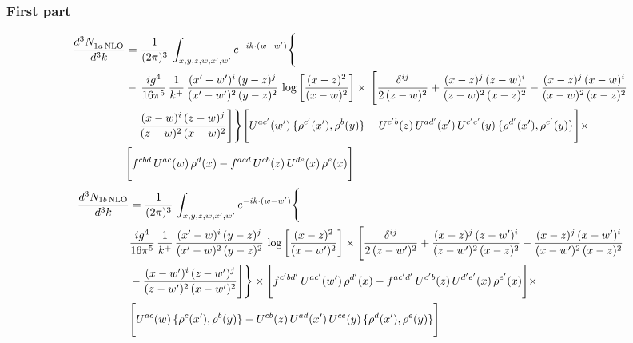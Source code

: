 \documentclass[9pt]{article}
\numberwithin{equation}{section}
\begin{document}
\subsubsection{First part}
\begin{align}
 \frac{d^{3}N_{1a\,\rm NLO}^{\rm}}{d^{3}k}  & =     \frac{1}{(2\pi)^{3}}\,\int_{x,y,z,w,x',w^{\prime}} e^{-ik\cdot (w-w')}\Bigg\{\notag \\
& -\, \frac{ig^{4}}{16\pi^{5}}\,\frac{1}{k^{+}}\, \frac{(x'-w')^{i}\,(y-z)^{j}}{(x'-w')^{2}\,(y-z)^{2}}\,\log{\left[\frac{(x-z)^{2}}{(x-w)^{2}}\right]}\times\,\Bigg[\frac{\delta^{ij}}{2\,(z-w)^{2}}+\frac{(x-z)^{j}\,(z-w)^{i}}{(z-w)^{2}\,(x-z)^{2}}-\frac{(x-z)^{j}\,(x-w)^{i}}{(x-w)^{2}\,(x-z)^{2}}\notag \\ & -\frac{(x-w)^{i}\,(z-w)^{j}}{(z-w)^{2}\,(x-w)^{2}}\Bigg]\Bigg\} \Bigg[U^{ac'}(w')\,\{\rho^{c'}(x'),\rho^{b}(y)\}-U^{c'b}(z)\,U^{ad'}(x')\,U^{c'e'}(y)\, \{\rho^{d'}(x'),\rho^{e'}(y)\}\Bigg]\times\notag \\ &  \Bigg[f^{cbd}\,U^{ac}(w)\,\rho^{d}(x)-f^{acd}\, U^{cb}(z)\,U^{de}(x)\,\rho^{e}(x)\Bigg]
\end{align}
\begin{align}
\frac{d^{3}N_{1b\, \rm NLO}}{d^{3}k} & =  \frac{1}{(2\pi)^{3}}\,\int_{x,y,z,w,x',w^{\prime}} e^{-ik\cdot (w-w')}\Bigg\{\notag \\
&  \frac{ig^{4}}{16\pi^{5}}\,\frac{1}{k^{+}}\, \frac{(x'-w)^{i}\,(y-z)^{j}}{(x'-w)^{2}\,(y-z)^{2}}\,\log{\left[\frac{(x-z)^{2}}{(x-w')^{2}}\right]}\times \Bigg[\frac{\delta^{ij}}{2\,(z-w')^{2}}+\frac{(x-z)^{j}\,(z-w')^{i}}{(z-w')^{2}\,(x-z)^{2}}-\frac{(x-z)^{j}\,(x-w')^{i}}{(x-w')^{2}\,(x-z)^{2}}\notag \\ & -\frac{(x-w')^{i}\,(z-w')^{j}}{(z-w')^{2}\,(x-w')^{2}}\Bigg]\Bigg\}  \times\Bigg[f^{c'bd'}\,U^{ac'}(w')\,\rho^{d'}(x)-f^{ac'd'}\, U^{c'b}(z)\,U^{d'e'}(x)\,\rho^{e'}(x)\Bigg] \times\notag \\ &  \Bigg[U^{ac}(w)\,\{\rho^{c}(x'),\rho^{b}(y)\}-U^{cb}(z)\,U^{ad}(x')\,U^{ce}(y)\, \{\rho^{d}(x'),\rho^{e}(y)\}\Bigg]
\end{align}
\end{document}
